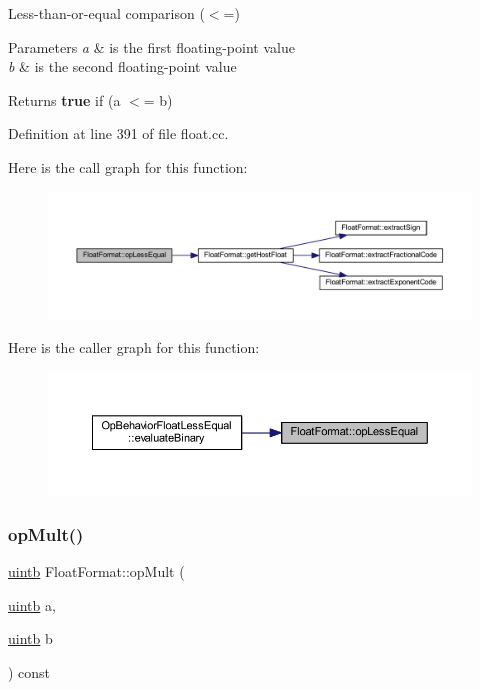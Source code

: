Less-\/than-\/or-\/equal comparison ($<$=) 


\begin{DoxyParams}{Parameters}
{\em a} & is the first floating-\/point value \\
\hline
{\em b} & is the second floating-\/point value \\
\hline
\end{DoxyParams}
\begin{DoxyReturn}{Returns}
{\bfseries{true}} if (a $<$= b) 
\end{DoxyReturn}


Definition at line 391 of file float.\+cc.

Here is the call graph for this function\+:
\nopagebreak
\begin{figure}[H]
\begin{center}
\leavevmode
\includegraphics[width=350pt]{class_float_format_adaf425a89e09270969f6fd848bf06025_cgraph}
\end{center}
\end{figure}
Here is the caller graph for this function\+:
\nopagebreak
\begin{figure}[H]
\begin{center}
\leavevmode
\includegraphics[width=350pt]{class_float_format_adaf425a89e09270969f6fd848bf06025_icgraph}
\end{center}
\end{figure}
\mbox{\label{class_float_format_a289c2216fe9add39e225991fc7baad3c}} 
\subsubsection{\texorpdfstring{opMult()}{opMult()}}
{\footnotesize\ttfamily \mbox{\hyperlink{types_8h_a2db313c5d32a12b01d26ac9b3bca178f}{uintb}} Float\+Format\+::op\+Mult (\begin{DoxyParamCaption}\item[{\mbox{\hyperlink{types_8h_a2db313c5d32a12b01d26ac9b3bca178f}{uintb}}}]{a,  }\item[{\mbox{\hyperlink{types_8h_a2db313c5d32a12b01d26ac9b3bca178f}{uintb}}}]{b }\end{DoxyParamCaption}) const}



